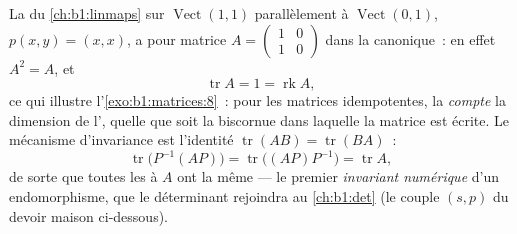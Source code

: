 \begin{example}
\label{ex:b1:matrices:tracework}
La  du \cref{ch:b1:linmaps} sur
$\operatorname{Vect}(1,1)$ parallèlement à $\operatorname{Vect}(0,1)$,
$p(x, y) = (x, x)$, a pour matrice $A = \begin{pmatrix} 1 & 0\\ 1 &
0\end{pmatrix}$ dans la  canonique~: en effet $A^2 = A$, et
\[
\operatorname{tr} A = 1 = \operatorname{rk} A ,
\]
ce qui illustre l'\cref{exo:b1:matrices:8}~: pour les matrices
idempotentes, la  \emph{compte} la dimension de l', quelle
que soit la  biscornue dans laquelle la matrice est écrite. Le
mécanisme d'invariance est l'identité $\operatorname{tr}(AB) =
\operatorname{tr}(BA)$~:
\[
\operatorname{tr}\bigl(P^{-1}(AP)\bigr) =
\operatorname{tr}\bigl((AP)P^{-1}\bigr) = \operatorname{tr} A ,
\]
de sorte que toutes les  à $A$ ont la même  ---
le premier \emph{invariant numérique} d'un endomorphisme, que le
déterminant rejoindra au \cref{ch:b1:det} (le couple $(s, p)$ du
devoir maison ci-dessous).
\end{example}

